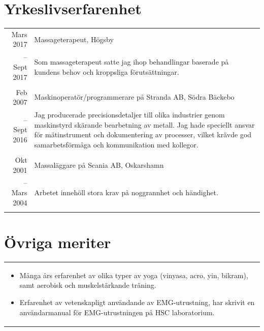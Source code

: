 \documentclass[11pt,a4paper]{article}
\begin{document}
\section{Yrkeslivserfarenhet}
\begin{tabularx}{\textwidth}{r|X}	
	Mars 2017 & Massageterapeut, Högsby \\
	-- Sept 2017 &\footnotesize{Som massageterapeut satte jag ihop behandlingar baserade på kundens behov och kroppsliga förutsättningar. }\\
	\multicolumn{2}{c}{} \\

	Feb 2007 & Maskinoperatör/programmerare på Stranda AB, Södra Bäckebo \\
	-- Sept 2016&\footnotesize{Jag producerade precisionsdetaljer till olika industrier genom maskinstyrd skärande bearbetning av metall. Jag hade speciellt ansvar för mätinstrument och dokumentering av processer, vilket krävde god samarbetsförmåga och kommunikation med kollegor.}\\
	\multicolumn{2}{c}{} \\
	
	Okt 2001& Massaläggare på Scania AB, Oskarshamn \\
	-- Mars 2004&\footnotesize{Arbetet innehöll stora krav på noggrannhet och händighet.}\\
	\multicolumn{2}{c}{} \\

\end{tabularx}

\section{Övriga meriter}
\begin{tabularx}{\textwidth}{X}
	\vspace{-7pt}
\begin{itemize}[leftmargin=0.8em]
	\item Många års erfarenhet av olika typer av yoga (vinyasa, acro, yin, bikram), samt aerobisk och muskelstärkande träning.
	\item Erfarenhet av vetenskapligt användande av EMG-utrustning, har skrivit en användarmanual för EMG-utrustningen på HSC laboratorium.
\end{itemize}
\end{tabularx}
\end{document}
